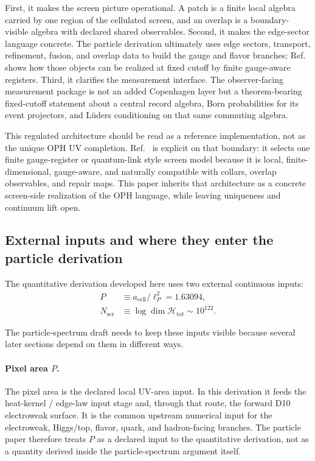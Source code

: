 \documentclass[11pt]{article}
\begin{document}
First, it makes the screen picture operational. A patch is a finite local
algebra carried by one region of the cellulated screen, and an overlap is a
boundary-visible algebra with declared shared observables. Second, it makes the edge-sector
language concrete. The particle derivation ultimately uses edge sectors, transport, refinement,
fusion, and overlap data to build the gauge and flavor branches; Ref.~\cite{ophmicrophysics} shows
how those objects can be realized at fixed cutoff by finite gauge-aware registers.
Third, it clarifies the measurement interface. The observer-facing measurement package is not an
added Copenhagen layer but a theorem-bearing fixed-cutoff statement about a central record
algebra, Born probabilities for its event projectors, and L\"uders conditioning on that same
commuting algebra.

This regulated architecture should be read as a reference implementation, not as the unique OPH
UV completion. Ref.~\cite{ophmicrophysics} is explicit on that boundary: it selects one finite
gauge-register or quantum-link style screen model because it is local, finite-dimensional,
gauge-aware, and naturally compatible with collars, overlap observables, and repair maps. This
paper inherits that architecture as a concrete screen-side realization of the OPH
language, while leaving uniqueness and continuum lift open.

\subsection{External inputs and where they enter the particle derivation}

The quantitative derivation developed here uses two external continuous inputs:
\begin{align}
P &\equiv a_{\mathrm{cell}}/\ell_P^2 = 1.63094,\\
N_{\mathrm{scr}} &\equiv \log \dim \mathcal H_{\mathrm{tot}} \sim 10^{122}.
\end{align}

The particle-spectrum draft needs to keep these inputs visible because several later sections
depend on them in different ways.

\paragraph{Pixel area \(P\).}
The pixel area is the declared local UV-area input. In this derivation it feeds the
heat-kernel / edge-law input stage and, through that route, the forward D10 electroweak
surface. It is the common upstream numerical
input for the electroweak, Higgs/top, flavor, quark, and hadron-facing branches. The particle
paper therefore treats \(P\) as a declared input to the quantitative
derivation, not as a quantity derived inside the particle-spectrum argument itself.
\end{document}
